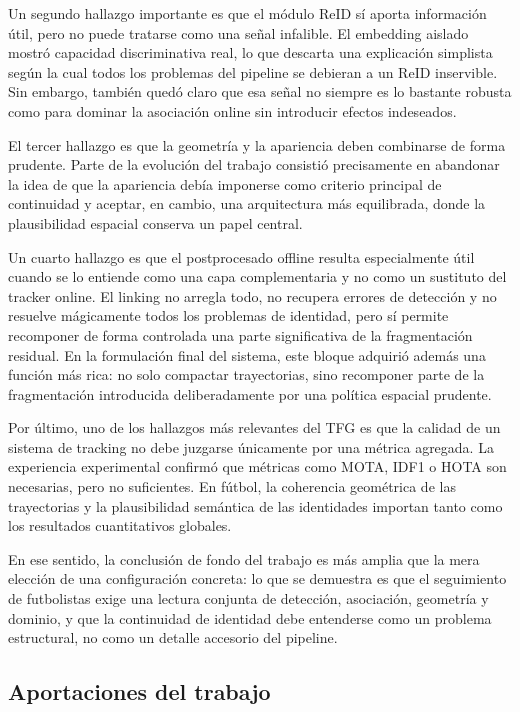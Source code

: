 \documentclass[../MAIN.tex]{subfiles}
\begin{document}
	Un segundo hallazgo importante es que el módulo ReID sí aporta información útil, pero no puede tratarse como una señal infalible. El embedding aislado mostró capacidad discriminativa real, lo que descarta una explicación simplista según la cual todos los problemas del pipeline se debieran a un ReID inservible. Sin embargo, también quedó claro que esa señal no siempre es lo bastante robusta como para dominar la asociación online sin introducir efectos indeseados.
	
	El tercer hallazgo es que la geometría y la apariencia deben combinarse de forma prudente. Parte de la evolución del trabajo consistió precisamente en abandonar la idea de que la apariencia debía imponerse como criterio principal de continuidad y aceptar, en cambio, una arquitectura más equilibrada, donde la plausibilidad espacial conserva un papel central.
	
	Un cuarto hallazgo es que el postprocesado offline resulta especialmente útil cuando se lo entiende como una capa complementaria y no como un sustituto del tracker online. El linking no arregla todo, no recupera errores de detección y no resuelve mágicamente todos los problemas de identidad, pero sí permite recomponer de forma controlada una parte significativa de la fragmentación residual. En la formulación final del sistema, este bloque adquirió además una función más rica: no solo compactar trayectorias, sino recomponer parte de la fragmentación introducida deliberadamente por una política espacial prudente.
	
	Por último, uno de los hallazgos más relevantes del TFG es que la calidad de un sistema de tracking no debe juzgarse únicamente por una métrica agregada. La experiencia experimental confirmó que métricas como MOTA, IDF1 o HOTA son necesarias, pero no suficientes. En fútbol, la coherencia geométrica de las trayectorias y la plausibilidad semántica de las identidades importan tanto como los resultados cuantitativos globales.
	
	En ese sentido, la conclusión de fondo del trabajo es más amplia que la mera elección de una configuración concreta: lo que se demuestra es que el seguimiento de futbolistas exige una lectura conjunta de detección, asociación, geometría y dominio, y que la continuidad de identidad debe entenderse como un problema estructural, no como un detalle accesorio del pipeline.
	
	\subsection{Aportaciones del trabajo}
	
\end{document}
